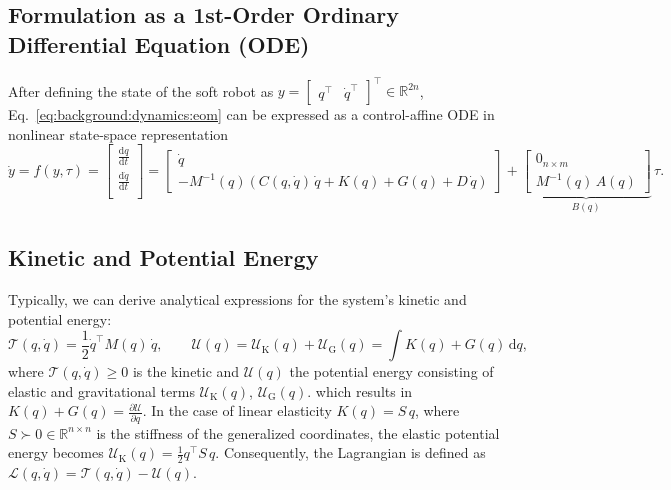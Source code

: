 \subsection{Formulation as a 1st-Order Ordinary Differential Equation (ODE)}
After defining the state of the soft robot as $y = \begin{bmatrix}
    q^\top & \dot{q}^\top
\end{bmatrix}^\top \in \mathbb{R}^{2n}$, Eq.~\ref{eq:background:dynamics:eom} can be expressed as a control-affine \gls{ODE} in nonlinear state-space representation
\begin{equation}
    \dot{y} = f(y,\tau) = \begin{bmatrix}
        \frac{\mathrm{d} q}{\mathrm{d}t}\\
        \frac{\mathrm{d} \dot{q}}{\mathrm{d}t}\\
    \end{bmatrix} = \begin{bmatrix}
        \dot{q}\\
        -M^{-1}(q) \left ( C(q,\dot{q}) \, \dot{q} + K(q) + G(q) + D \, \dot{q} \right )
    \end{bmatrix} + \underbrace{\begin{bmatrix}
        0_{n \times m}\\ M^{-1}(q) \, A(q)
    \end{bmatrix}}_{B(q)} \, \tau.
\end{equation}

\subsection{Kinetic and Potential Energy}
Typically, we can derive analytical expressions for the system’s kinetic and potential energy:
\begin{equation}
    \mathcal{T}(q,\dot{q}) = \frac{1}{2} \dot{q}^\top M(q) \, \dot{q},
    \qquad
    \mathcal{U}(q) = \mathcal{U}_\mathrm{K}(q) + \mathcal{U}_\mathrm{G}(q) = \int K(q) + G(q) \, \mathrm{d}q,
\end{equation}
where $\mathcal{T}(q,\dot{q}) \geq 0$ is the kinetic and $\mathcal{U}(q)$ the potential energy consisting of elastic and gravitational terms $\mathcal{U}_\mathrm{K}(q)$, $\mathcal{U}_\mathrm{G}(q)$.
which results in $K(q) + G(q) = \frac{\partial \mathcal{U}}{\partial q}$. 
In the case of linear elasticity $K(q) = S \, q$, where $S \succ 0 \in \mathbb{R}^{n \times n}$ is the stiffness of the generalized coordinates, the elastic potential energy becomes $\mathcal{U}_\mathrm{K}(q) = \frac{1}{2} q^\top S \, q$.
Consequently, the Lagrangian is defined as $\mathcal{L}(q,\dot{q}) = \mathcal{T}(q,\dot{q}) - \mathcal{U}(q)$.

